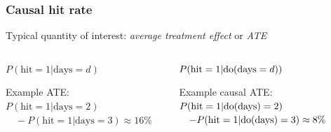 \begin{frame}
\frametitle{Causal hit rate}
Typical quantity of interest: \emph{average treatment effect} or \emph{ATE}
\begin{columns}[T] %
    \begin{column}{.48\textwidth}
    $P(\textrm{hit}=1 | \textrm{days}=d)$\newline
    
    \newline\newline
    
    Example ATE: \newline
    $P(\textrm{hit}=1 | \textrm{days} = 2) $\newline
    $\quad - P(\textrm{hit}=1 | \textrm{days} = 3) \approx  16\%$
    \end{column}%
    \begin{column}{.48\textwidth}
        $P(\textrm{hit}=1 | \mathrm{do}(\textrm{days}=d))$\newline
        
          \newline \newline
	Example causal ATE: \newline
	$P(\textrm{hit}=1 |\mathrm{do}(\textrm{days} )= 2)$\newline
	$\quad - P(\textrm{hit}=1 | \mathrm{do}(\textrm{days}) = 3) \approx 8\%$
         \end{column}%
    \end{columns}

\end{frame}

